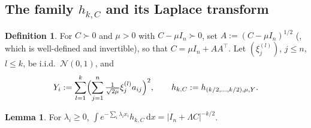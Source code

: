 \documentclass[12pt,a4paper]{article}
\theoremstyle{definition}
\newtheorem{lemma}[theorem]{Lemma}
\newtheorem{definition}[theorem]{Definition}
\newcommand{\dd}{\mathrm{d}}
\newcommand{\caln}{\mathcal{N}}
\begin{document}
\subsection{The family \texorpdfstring{$h_{k,C}$}{h(k,C)} and its Laplace transform}
  \label{sec:hkC}

\begin{definition}\label{def:hkC}
  For $C\succ 0$ and $\mu>0$ with $C-\mu I_n\succ 0$, set
  $A:=(C-\mu I_n)^{1/2}$ (, which is well-defined and
  invertible), so that $C=\mu I_n+AA^\top$.  Let $(\xi_j^{(l)})$,
  $j\leqslant n$, $l\leqslant k$, be i.i.d.\ $\caln(0,1)$, and
  \begin{equation}\label{eq:defhkC}
    Y_i:=\sum_{l=1}^k\Bigl(\sum_{j=1}^n
      \tfrac{1}{\sqrt{2\mu}}\xi_j^{(l)}a_{ij}\Bigr)^2,
    \qquad
    h_{k,C}:=h_{(k/2,\ldots,k/2),\mu,Y}.
  \end{equation}
\end{definition}

\begin{lemma}\label{lem:LaplhkC}
  For $\lambda_i\geqslant 0$,
  $\int e^{-\sum_i\lambda_ix_i}h_{k,C}\,\dd x
  =|I_n+\Lambda C|^{-k/2}$.
\end{lemma}
\end{document}
